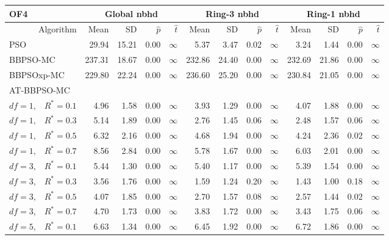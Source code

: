 \documentclass[cmbright]{staauth}
\begin{document}
\begin{table}[ht]
\centering
\tiny{
\begin{tabular}{r|rrrr|rrrr|rrrr}
\multicolumn{1}{l}{OF4} & \multicolumn{4}{c}{Global nbhd} & \multicolumn{4}{c}{Ring-3 nbhd} & \multicolumn{4}{c}{Ring-1 nbhd}\\
  \hline
Algorithm & Mean & SD & $\widehat{p}$ & $\widehat{t}$ & Mean & SD & $\widehat{p}$ & $\widehat{t}$ & Mean & SD & $\widehat{p}$ & $\widehat{t}$ \\
  \hline
\multicolumn{1}{l|}{PSO} & 29.94 & 15.21 & 0.00 & $\infty$ & 5.37 & 3.47 & 0.02 & $\infty$ & 3.24 & 1.44 & 0.00 & $\infty$ \\
  \multicolumn{1}{l|}{BBPSO-MC} & 237.31 & 18.67 & 0.00 & $\infty$ & 232.86 & 24.40 & 0.00 & $\infty$ & 232.69 & 21.86 & 0.00 & $\infty$ \\
  \multicolumn{1}{l|}{BBPSOxp-MC} & 229.80 & 22.24 & 0.00 & $\infty$ & 236.60 & 25.20 & 0.00 & $\infty$ & 230.84 & 21.05 & 0.00 & $\infty$ \\
\hline
\multicolumn{1}{l|}{AT-BBPSO-MC} &&&&&&&&&&&&\\
  $df = 1,\enspace$ $R^* =0.1$ & 4.96 & 1.58 & 0.00 & $\infty$ & 3.93 & 1.29 & 0.00 & $\infty$ & 4.07 & 1.88 & 0.00 & $\infty$ \\
  $df = 1,\enspace$ $R^* =0.3$ & 5.14 & 1.89 & 0.00 & $\infty$ & 2.76 & 1.45 & 0.06 & $\infty$ & 2.48 & 1.57 & 0.06 & $\infty$ \\
  $df = 1,\enspace$ $R^* =0.5$ & 6.32 & 2.16 & 0.00 & $\infty$ & 4.68 & 1.94 & 0.00 & $\infty$ & 4.24 & 2.36 & 0.02 & $\infty$ \\
  $df = 1,\enspace$ $R^* =0.7$ & 8.56 & 2.84 & 0.00 & $\infty$ & 5.78 & 1.67 & 0.00 & $\infty$ & 6.03 & 2.01 & 0.00 & $\infty$ \\
  $df = 3,\enspace$ $R^* =0.1$ & 5.44 & 1.30 & 0.00 & $\infty$ & 5.40 & 1.17 & 0.00 & $\infty$ & 5.39 & 1.54 & 0.00 & $\infty$ \\
  $df = 3,\enspace$ $R^* =0.3$ & 3.56 & 1.76 & 0.00 & $\infty$ & 1.59 & 1.24 & 0.20 & $\infty$ & 1.43 & 1.00 & 0.18 & $\infty$ \\
  $df = 3,\enspace$ $R^* =0.5$ & 4.07 & 1.85 & 0.00 & $\infty$ & 2.70 & 1.57 & 0.08 & $\infty$ & 2.57 & 1.44 & 0.02 & $\infty$ \\
  $df = 3,\enspace$ $R^* =0.7$ & 4.70 & 1.73 & 0.00 & $\infty$ & 3.83 & 1.72 & 0.00 & $\infty$ & 3.43 & 1.75 & 0.06 & $\infty$ \\
  $df = 5,\enspace$ $R^* =0.1$ & 6.63 & 1.34 & 0.00 & $\infty$ & 6.45 & 1.92 & 0.00 & $\infty$ & 6.72 & 1.86 & 0.00 & $\infty$ \\

\end{tabular}}
\end{table}
\end{document}
